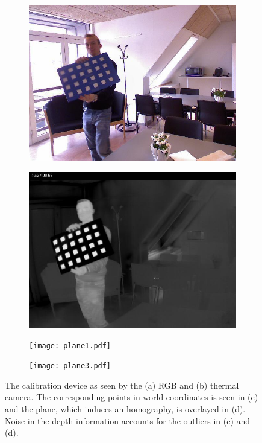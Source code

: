 \documentclass[10pt,twocolumn,letterpaper]{article}
\begin{document}
\begin{figure}[ht]
\centering
\begin{subfigure}[b]{0.48\columnwidth}
	\includegraphics[width=\columnwidth]{RGB00064.png}%
	\caption{}
\end{subfigure}
\begin{subfigure}[b]{0.48\columnwidth}
	\includegraphics[width=\columnwidth]{T00064.jpg}%
	\caption{}%
\end{subfigure}
\begin{subfigure}[b]{0.48\columnwidth}
	\texttt{[image: plane1.pdf]}%
	\caption{}
\end{subfigure}
\begin{subfigure}[b]{0.48\columnwidth}
	\texttt{[image: plane3.pdf]}%
	\caption{}%
\end{subfigure}
\caption{The calibration device as seen by the (a) RGB and (b) thermal camera. The corresponding points in world coordinates is seen in (c) and the plane, which induces an homography, is overlayed in (d). Noise in the depth information accounts for the outliers in (c) and (d).}
\label{fig:calibrationDevice}
\end{figure}
\end{document}
